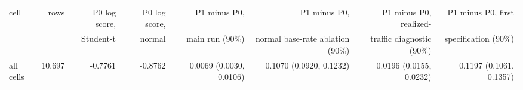 \begin{tabular}{lrrrrrrr}
\toprule
cell & rows & P0 log score, & P0 log score, & P1 minus P0, & P1 minus P0, & P1 minus P0, realized- & P1 minus P0, first \\
 & & Student-t & normal & main run (90\%) & normal base-rate ablation (90\%) & traffic diagnostic (90\%) & specification (90\%) \\
\midrule
all cells & 10,697 & -0.7761 & -0.8762 & 0.0069 (0.0030, 0.0106) & 0.1070 (0.0920, 0.1232) & 0.0196 (0.0155, 0.0232) & 0.1197 (0.1061, 0.1357) \\

\end{tabular}

